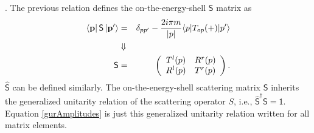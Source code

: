 \cite{Muga2004}. The previous relation defines the on-the-energy-shell $\mathsf{S}$ matrix as
%
\begin{eqnarray}
  \bra{\mathbf{p}} \mathsf{S} \ket{\mathbf{p'}} &=& \delta_{pp'} - \frac{2i\pi m}{|p|} \langle p|T_{op}(+)|p'\rangle \nonumber \\
  & \Downarrow & \\
  \mathsf{S} &=&
  \left(
  \begin{array}{cc}
    T^l(p)&R^r(p)
    \\
    R^l(p)&T^r(p)
  \end{array}
  \right)\nonumber.
\end{eqnarray}
%
$\mathsf{\widehat{S}}$ can be defined similarly. The on-the-energy-shell scattering matrix $\mathsf{S}$ inherits the generalized unitarity relation of the scattering operator $S$, i.e., $\mathsf{\widehat{S}}^\dagger\mathsf{S} = \mathsf{1}$. Equation \eqref{gurAmplitudes} is just this generalized unitarity relation written for all matrix elements.



%
%
%
%
%
%
